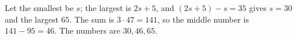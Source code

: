 Let the smallest be $s$; the largest is $2s+5$, and $(2s+5)-s=35$ gives $s=30$ and the largest $65$. The sum is $3\cdot47=141$, so the middle number is $141-95=46$. The numbers are $\boxed{30,46,65}$.

